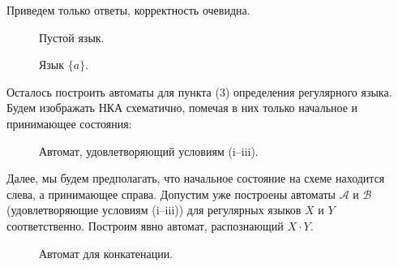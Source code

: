 \begin{nonum}
  Приведем только ответы, корректность очевидна.

  \begin{figure}[!h]
    \centering
    \begin{minipage}{.5\textwidth}
      \centering
      \caption{Пустой язык.}
    \end{minipage}%
    \begin{minipage}{.5\textwidth}
      \centering
      \caption{Язык $\{a\}$.}
    \end{minipage}
  \end{figure}
\end{nonum}


Осталось построить автоматы для пункта (3) определения регулярного языка. Будем изображать НКА схематично, помечая в них только начальное и принимающее состояния:
\begin{figure}[!h]
  \centering
  \caption{Автомат, удовлетворяющий условиям (i–iii).}
\end{figure}

Далее, мы будем предполагать, что начальное состояние на схеме
находится слева, а принимающее справа.
Допустим уже построены автоматы $\mathcal{A}$ и $\mathcal{B}$ (удовлетворяющие условиям (i–iii)) для регулярных языков
$X$ и $Y$ соответственно. Построим
явно автомат, распознающий $X \cdot Y$.

\begin{figure}[!ht]
  \centering
  \caption{Автомат для конкатенации.}
  \label{fig:concatFA}
\end{figure}

